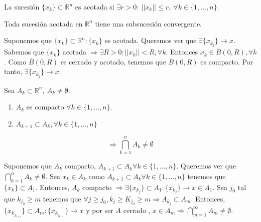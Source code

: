 \begin{defn}
La sucesión $\{x_k\} \subset \mathbb{R}^n$ es acotada si $\exists r > 0: \ ||x_k|| \leq r, \ \forall k \in \{1,...,n\}$.
\end{defn}

\begin{theo}
Toda sucesión acotada en $\mathbb{R}^n$ tiene una subsucesión convergente.\\
\end{theo}

\begin{dem}
Suponemos que $\{x_k\} \subset \mathbb{R}^n : \{x_k\}$ es acotada. Queremos ver que $\exists\{x_{k_j}\} \rightarrow x$. Sabemos que $\{x_k\}$ acotada $\Rightarrow \exists R > 0 : ||x_k|| < R, \forall k$. Entonces $ x_k \in \overline{B}(0,R),\forall k$. Como $\overline{B}(0,R)$ es cerrado y acotado, tenemos que $\overline{B}(0,R)$ es compacto. Por tanto, $\exists \{x_{k_j}\} \rightarrow x$.
\end{dem}

\begin{theo}
Sea $A_k \subset \mathbb{R}^n, \ A_k \neq \emptyset:$

\begin{enumerate}[label=(\roman*)]
    \item $A_k$ es compacto $\forall k \in \{1,...,n\}$.
    \item $A_{k+1} \subset A_k, \forall k \in \{1,...,n\}$
\end{enumerate}

\[\Rightarrow \bigcap_{k=1}^n A_k \neq \emptyset\]
\end{theo}

\begin{dem}
Suponemos que $A_k$ compacto, $A_{k+1} \subset A_k \forall k \in \{1,...,n\}$. Queremos ver que $\bigcap_{k=1}^n A_k \neq \emptyset$. Sea $x_k \in A_k$ como $A_{k+1} \subset A_k \forall k \in \{1,...,n\}$ tenemos que $\{x_k\} \subset A_1$. Entonces, $A_k$ compacto $\Rightarrow \exists \{x_{k_j}\} \subset A_1 : \{x_{k_j}\} \rightarrow x \in A_1$. Sea $j_0$ tal que $k_{j_0} \geq m$ tenemos que $\forall j \geq j_0, k_j \geq K_{j_0} \geq m \Rightarrow A_{k_j} \subset A_m$. Entonces, $\{ x_{k_{j_{0 + i}}}\}\subset A_m: \{ x_{k_{j_{0 + i}}}\} \rightarrow x $ y por ser $A$ cerrado , $x\in A_m \Rightarrow \bigcap_{m=1}^{\infty} A_m \neq \emptyset$.
\end{dem}

